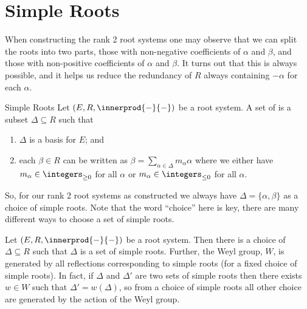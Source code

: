 \documentclass[fleqn]{NotesClass}
\begin{document}
    \section{Simple Roots}
    When constructing the rank 2 root systems one may observe that we can split the roots into two parts, those with non-negative coefficients of \(\alpha\) and \(\beta\), and those with non-positive coefficients of \(\alpha\) and \(\beta\).
    It turns out that this is always possible, and it helps us reduce the redundancy of \(R\) always containing \(-\alpha\) for each \(\alpha\).
    
    \begin{dfn}{Simple Roots}{}
        Let \((E, R, \innerprod{-}{-})\) be a root system.
        A set of  is a subset \(\Delta \subseteq R\) such that
        \begin{enumerate}
            \item \(\Delta\) is a basis for \(E\); and
            \item each \(\beta \in R\) can be written as \(\beta = \sum_{\alpha \in \Delta} m_\alpha \alpha\) where we either have \(m_\alpha \in \integers_{\ge 0}\) for all \(\alpha\) or \(m_{\alpha} \in \integers_{\le 0}\) for all \(\alpha\).
        \end{enumerate}
    \end{dfn}
    
    So, for our rank 2 root systems as constructed we always have \(\Delta = \{\alpha, \beta\}\) as a choice of simple roots.
    Note that the word \enquote{choice} here is key, there are many different ways to choose a set of simple roots.
    
    \begin{thm}{}{}
        Let \((E, R, \innerprod{-}{-})\) be a root system.
        Then there is a choice of \(\Delta \subseteq R\) such that \(\Delta\) is a set of simple roots.
        Further, the Weyl group, \(W\), is generated by all reflections corresponding to simple roots (for a fixed choice of simple roots).
        In fact, if \(\Delta\) and \(\Delta'\) are two sets of simple roots then there exists \(w \in W\) such that \(\Delta' = w(\Delta)\), so from a choice of simple roots all other choice are generated by the action of the Weyl group.
    \end{thm}
    
\end{document}

